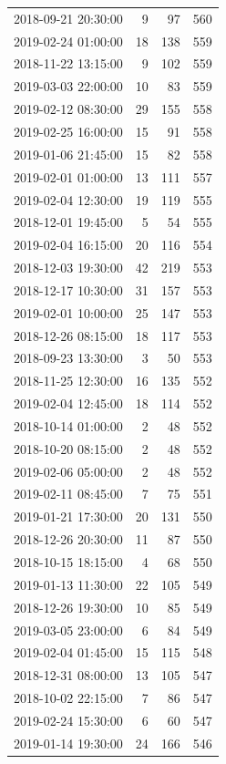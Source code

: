 \begin{tabular}{lrrr}
2018-09-21 20:30:00 & 9 & 97 & 560 \\
2019-02-24 01:00:00 & 18 & 138 & 559 \\
2018-11-22 13:15:00 & 9 & 102 & 559 \\
2019-03-03 22:00:00 & 10 & 83 & 559 \\
2019-02-12 08:30:00 & 29 & 155 & 558 \\
2019-02-25 16:00:00 & 15 & 91 & 558 \\
2019-01-06 21:45:00 & 15 & 82 & 558 \\
2019-02-01 01:00:00 & 13 & 111 & 557 \\
2019-02-04 12:30:00 & 19 & 119 & 555 \\
2018-12-01 19:45:00 & 5 & 54 & 555 \\
2019-02-04 16:15:00 & 20 & 116 & 554 \\
2018-12-03 19:30:00 & 42 & 219 & 553 \\
2018-12-17 10:30:00 & 31 & 157 & 553 \\
2019-02-01 10:00:00 & 25 & 147 & 553 \\
2018-12-26 08:15:00 & 18 & 117 & 553 \\
2018-09-23 13:30:00 & 3 & 50 & 553 \\
2018-11-25 12:30:00 & 16 & 135 & 552 \\
2019-02-04 12:45:00 & 18 & 114 & 552 \\
2018-10-14 01:00:00 & 2 & 48 & 552 \\
2018-10-20 08:15:00 & 2 & 48 & 552 \\
2019-02-06 05:00:00 & 2 & 48 & 552 \\
2019-02-11 08:45:00 & 7 & 75 & 551 \\
2019-01-21 17:30:00 & 20 & 131 & 550 \\
2018-12-26 20:30:00 & 11 & 87 & 550 \\
2018-10-15 18:15:00 & 4 & 68 & 550 \\
2019-01-13 11:30:00 & 22 & 105 & 549 \\
2018-12-26 19:30:00 & 10 & 85 & 549 \\
2019-03-05 23:00:00 & 6 & 84 & 549 \\
2019-02-04 01:45:00 & 15 & 115 & 548 \\
2018-12-31 08:00:00 & 13 & 105 & 547 \\
2018-10-02 22:15:00 & 7 & 86 & 547 \\
2019-02-24 15:30:00 & 6 & 60 & 547 \\
2019-01-14 19:30:00 & 24 & 166 & 546 \\

\end{tabular}
